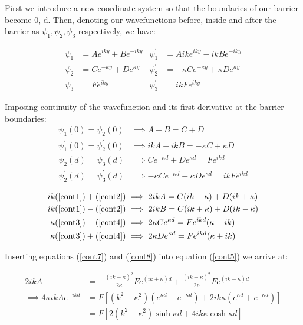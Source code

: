 \documentclass{article}
\begin{document}
First we introduce a new coordinate system so that the boundaries of our barrier become 0, d. Then, denoting our wavefunctions before, inside and after the barrier as $\psi_{1}, \psi_{2}, \psi_{3}$ respectively, we have:

\begin{align}
	\psi_{1} &= Ae^{iky} + Be^{-iky} & \psi_{1}^{'} &= Aike^{iky} - ikBe^{-iky} \\
	\psi_{2} &= Ce^{-\kappa y} + De^{\kappa y} & \psi_{2}^{'} &= -\kappa Ce^{-\kappa y} + \kappa De^{\kappa y} \\
	\psi_{3} &= Fe^{iky} & \psi_{3}^{'} &= ikFe^{iky}
\end{align}

Imposing continuity of the wavefunction and its first derivative at the barrier boundaries:
\begin{align}
	\psi_{1}(0) = \psi_{2}(0) &\implies A+B = C+D \\
	\psi_{1}^{'}(0) = \psi_{2}^{'}(0) &\implies ikA - ikB = -\kappa C + \kappa D \\
	\psi_{2}(d) = \psi_{3}(d) &\implies Ce^{-\kappa d} + De^{\kappa d} = Fe^{ikd} \\
	\psi_{2}^{'}(d) = \psi_{3}^{'}(d) &\implies -\kappa Ce^{-\kappa d} + \kappa De^{\kappa d} = ikF e^{ikd} 
\end{align}

\begin{align}
	ik(\ref{cont1})+(\ref{cont2}) &\implies 2ikA = C(ik-\kappa)+D(ik+\kappa) \\
	ik(\ref{cont1})-(\ref{cont2}) &\implies 2ikB = C(ik+\kappa)+D(ik-\kappa) \\
	\kappa(\ref{cont3})-(\ref{cont4}) &\implies 2\kappa Ce^{\kappa d} = Fe^{ikd}(\kappa-ik)\\
	\kappa(\ref{cont3})+(\ref{cont4}) &\implies 2\kappa De^{\kappa d} = Fe^{ikd}(\kappa+ik) 
\end{align}

Inserting equations (\ref{cont7}) and (\ref{cont8}) into equation (\ref{cont5}) we arrive at:

\begin{align}
	2ikA &= -\frac{(ik-\kappa)^2}{2\kappa}Fe^{(ik+\kappa)d}+\frac{(ik+\kappa)^2}{2p}Fe^{(ik-\kappa)d} \\
	\implies 4\kappa ikAe^{-ikd} &= F[(k^2-\kappa^2)(e^{\kappa d}-e^{-\kappa d})+2ik\kappa(e^{\kappa d}+e^{-\kappa d})] \\
				     &= F[2(k^2-\kappa^2)\sinh{\kappa d}+4ik\kappa \cosh{\kappa d}] 
\end{align}
\end{document}
